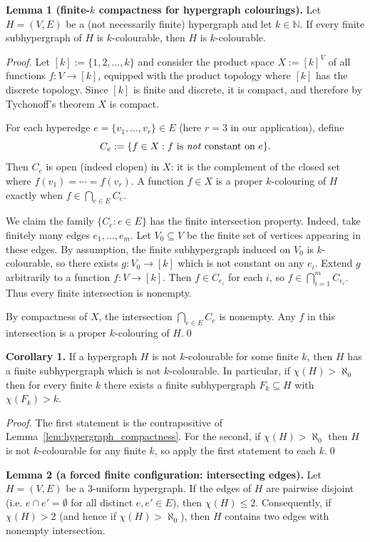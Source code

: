 \medskip
\noindent\textbf{Lemma 1 (finite-$k$ compactness for hypergraph colourings).}\label{lem:hypergraph_compactness}
Let $H=(V,E)$ be a (not necessarily finite) hypergraph and let $k\in\mathbb{N}$.
If every finite subhypergraph of $H$ is $k$-colourable, then $H$ is $k$-colourable.

\emph{Proof.}
Let $[k]:=\{1,2,\dots,k\}$ and consider the product space $X:=[k]^V$ of all functions $f:V\to[k]$, equipped with the product topology where $[k]$ has the discrete topology.
Since $[k]$ is finite and discrete, it is compact, and therefore by Tychonoff's theorem $X$ is compact.

For each hyperedge $e=\{v_1,\dots,v_r\}\in E$ (here $r=3$ in our application), define
\[
C_e:=\{f\in X: \text{$f$ is \emph{not} constant on $e$}\}.
\]
Then $C_e$ is open (indeed clopen) in $X$: it is the complement of the closed set where $f(v_1)=\cdots=f(v_r)$.
A function $f\in X$ is a proper $k$-colouring of $H$ exactly when $f\in\bigcap_{e\in E} C_e$.

We claim the family $\{C_e:e\in E\}$ has the finite intersection property.
Indeed, take finitely many edges $e_1,\dots,e_m$.
Let $V_0\subseteq V$ be the finite set of vertices appearing in these edges.
By assumption, the finite subhypergraph induced on $V_0$ is $k$-colourable, so there exists $g:V_0\to[k]$ which is not constant on any $e_i$.
Extend $g$ arbitrarily to a function $f:V\to[k]$.
Then $f\in C_{e_i}$ for each $i$, so $f\in\bigcap_{i=1}^m C_{e_i}$.
Thus every finite intersection is nonempty.

By compactness of $X$, the intersection $\bigcap_{e\in E} C_e$ is nonempty.
Any $f$ in this intersection is a proper $k$-colouring of $H$.\qed

\medskip
\noindent\textbf{Corollary 1.}\label{cor:finite_obstructions}
If a hypergraph $H$ is not $k$-colourable for some finite $k$, then $H$ has a finite subhypergraph which is not $k$-colourable.
In particular, if $\chi(H)>\aleph_0$ then for every finite $k$ there exists a finite subhypergraph $F_k\subseteq H$ with $\chi(F_k)>k$.

\emph{Proof.}
The first statement is the contrapositive of Lemma~\ref{lem:hypergraph_compactness}.
For the second, if $\chi(H)>\aleph_0$ then $H$ is not $k$-colourable for any finite $k$, so apply the first statement to each $k$.\qed

\medskip
\noindent\textbf{Lemma 2 (a forced finite configuration: intersecting edges).}\label{lem:intersecting_edges}
Let $H=(V,E)$ be a 3-uniform hypergraph.
If the edges of $H$ are pairwise disjoint (i.e. $e\cap e'=\emptyset$ for all distinct $e,e'\in E$), then $\chi(H)\le 2$.
Consequently, if $\chi(H)>2$ (and hence if $\chi(H)>\aleph_0$), then $H$ contains two edges with nonempty intersection.

